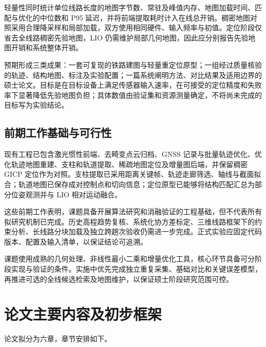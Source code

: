 \documentclass[UTF8,a4paper,12pt,fontset=fandol]{ctexart}
\begin{document}
轻量性同时统计单位线路长度的地图字节数、常驻及峰值内存、地图加载时间、匹配与优化的中位数和 P95 延迟，并将前端提取耗时计入在线总开销。稠密地图对照采用合理降采样和局部加载，双方使用相同硬件、输入频率与初值。定位阶段仅省去全线路稠密先验地图，LIO 仍需维护局部几何地图，因此应分别报告先验地图开销和系统整体开销。

预期形成三类成果：一套可复现的铁路建图与轻量重定位原型；一组经过质量核验的轨迹、结构地图、标注及实验配置；一篇系统阐明方法、对比结果及适用边界的硕士论文。目标是在目标设备上满足传感器输入速率，在可接受的定位精度和失败率下显著降低先验地图负担；具体数值由验证集和资源测量确定，不将尚未完成的目标写为实验结论。

\subsection{前期工作基础与可行性}

现有工程已包含激光惯性前端、去畸变点云归档、GNSS 记录与批量轨迹优化、优化轨迹地图重建、支柱和轨道提取、稀疏地图定位及增量图后端，并保留稠密 GICP 定位作为对照。支柱提取已采用距离关键帧、轨迹走廊筛选、轴线与截面拟合；轨道地图已保存成对控制点和切向信息；定位原型已能够将结构匹配汇总为部分位姿观测并与 LIO 相对运动融合。

这些前期工作表明，课题具备开展算法研究和消融验证的工程基础，但不代表所有拟研究机制已完成。历史高程趋势复核、系统化协方差标定、三维线路框架下的约束分析、长线路分块加载及独立跨趟次验收仍需进一步完成。正式实验应固定代码版本、配置及输入清单，以保证结论可追溯。

课题使用成熟的几何处理、非线性最小二乘和增量优化工具，核心环节具备可分阶段实现与验证的条件。实施中优先完成独立重复采集、基础对比和关键误差模型，再推进可选的全线候选检索及地图维护，以保证硕士阶段研究范围可控。

\section{论文主要内容及初步框架}

论文拟分为六章，章节安排如下。
\end{document}
